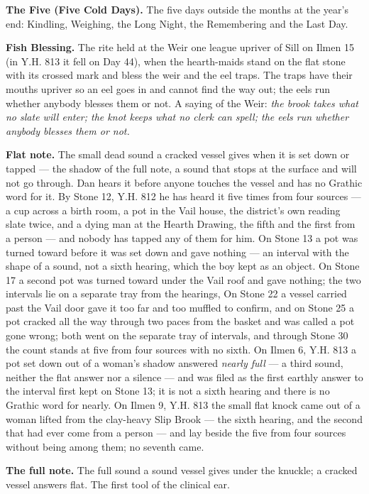 \documentclass{design/chronicle}
\begin{document}
\textbf{The Five (Five Cold Days).} The five days outside the months at the year’s end: Kindling, Weighing, the Long Night, the Remembering and the Last Day.

\textbf{Fish Blessing.} The rite held at the Weir one league upriver of Sill on Ilmen 15 (in Y.H. 813 it fell on Day 44), when the hearth-maids stand on the flat stone with its crossed mark and bless the weir and the eel traps. The traps have their mouths upriver so an eel goes in and cannot find the way out; the eels run whether anybody blesses them or not. A saying of the Weir: \emph{the brook takes what no slate will enter; the knot keeps what no clerk can spell; the eels run whether anybody blesses them or not.}

\textbf{Flat note.} The small dead sound a cracked vessel gives when it is set down or tapped --- the shadow of the full note, a sound that stops at the surface and will not go through. Dan hears it before anyone touches the vessel and has no Grathic word for it. By Stone 12, Y.H. 812 he has heard it five times from four sources --- a cup across a birth room, a pot in the Vail house, the district’s own reading slate twice, and a dying man at the Hearth Drawing, the fifth and the first from a person --- and nobody has tapped any of them for him. On Stone 13 a pot was turned toward before it was set down and gave nothing --- an interval with the shape of a sound, not a sixth hearing, which the boy kept as an object. On Stone 17 a second pot was turned toward under the Vail roof and gave nothing; the two intervals lie on a separate tray from the hearings, On Stone 22 a vessel carried past the Vail door gave it too far and too muffled to confirm, and on Stone 25 a pot cracked all the way through two paces from the basket and was called a pot gone wrong; both went on the separate tray of intervals, and through Stone 30 the count stands at five from four sources with no sixth. On Ilmen 6, Y.H. 813 a pot set down out of a woman’s shadow answered \emph{nearly full} --- a third sound, neither the flat answer nor a silence --- and was filed as the first earthly answer to the interval first kept on Stone 13; it is not a sixth hearing and there is no Grathic word for nearly. On Ilmen 9, Y.H. 813 the small flat knock came out of a woman lifted from the clay-heavy Slip Brook --- the sixth hearing, and the second that had ever come from a person --- and lay beside the five from four sources without being among them; no seventh came.

\textbf{The full note.} The full sound a sound vessel gives under the knuckle; a cracked vessel answers flat. The first tool of the clinical ear.
\end{document}
